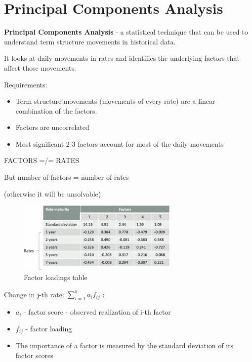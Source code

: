 \documentclass{article}
\begin{document}
\section{Principal Components Analysis}

\textbf{Principal Components Analysis} - a statistical technique that can be used to understand term structure movements in historical data.

It looks at daily movements in rates and identifies the underlying factors that affect those movements.

Requirements:
\begin{itemize}
    \item Term structure movements (movements of every rate) are a linear combination of the factors.

    \item Factors are uncorrelated

    \item Most significant 2-3 factors account for most of the daily movements
\end{itemize}

\begin{center}
    FACTORS =/= RATES
    
    But number of factors = number of rates

    (otherwise it will be unsolvable)
\end{center}

\begin{figure}[h]
\centering
\includegraphics[width=0.7\textwidth]{factor loadings table.png}
\caption{Factor loadings table}
\label{loadings}
\end{figure}

Change in j-th rate: $\sum_{i=1}^{5} a_i f_{ij}$ :
\begin{itemize}
    \item $a_i$ - factor score - observed realization of i-th factor

    \item $f_{ij}$ - factor loading

    \item The importance of a factor is measured by the standard deviation of its factor scores
\end{itemize}
\end{document}
